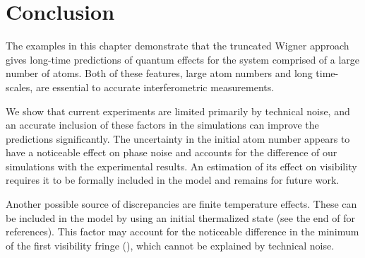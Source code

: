 \section{Conclusion}

The examples in this chapter demonstrate that the truncated Wigner approach gives long-time predictions of quantum effects for the system comprised of a large number of atoms.
Both of these features, large atom numbers and long time-scales, are essential to accurate interferometric measurements.

We show that current experiments are limited primarily by technical noise, and an accurate inclusion of these factors in the simulations can improve the predictions significantly.
The uncertainty in the initial atom number appears to have a noticeable effect on phase noise and accounts for the difference of our simulations with the experimental results.
An estimation of its effect on visibility requires it to be formally included in the model and remains for future work.

Another possible source of discrepancies are finite temperature effects.
These can be included in the model by using an initial thermalized state (see the end of  for references).
This factor may account for the noticeable difference in the minimum of the first visibility fringe (), which cannot be explained by technical noise.
